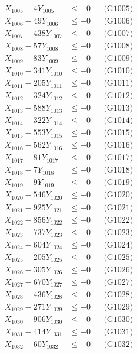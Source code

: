 \documentclass[a4paper,10pt]{article}
\begin{document}
{\begin{align}
X_{1005} - 4Y_{1005} &\leq +0 && \text{(G1005)} \\
X_{1006} - 49Y_{1006} &\leq +0 && \text{(G1006)} \\
X_{1007} - 438Y_{1007} &\leq +0 && \text{(G1007)} \\
X_{1008} - 57Y_{1008} &\leq +0 && \text{(G1008)} \\
X_{1009} - 83Y_{1009} &\leq +0 && \text{(G1009)} \\
X_{1010} - 341Y_{1010} &\leq +0 && \text{(G1010)} \\
\allowbreak
X_{1011} - 205Y_{1011} &\leq +0 && \text{(G1011)} \\
X_{1012} - 324Y_{1012} &\leq +0 && \text{(G1012)} \\
X_{1013} - 588Y_{1013} &\leq +0 && \text{(G1013)} \\
X_{1014} - 322Y_{1014} &\leq +0 && \text{(G1014)} \\
X_{1015} - 553Y_{1015} &\leq +0 && \text{(G1015)} \\
X_{1016} - 562Y_{1016} &\leq +0 && \text{(G1016)} \\
X_{1017} - 81Y_{1017} &\leq +0 && \text{(G1017)} \\
X_{1018} - 7Y_{1018} &\leq +0 && \text{(G1018)} \\
X_{1019} - 9Y_{1019} &\leq +0 && \text{(G1019)} \\
X_{1020} - 546Y_{1020} &\leq +0 && \text{(G1020)} \\
\allowbreak
X_{1021} - 925Y_{1021} &\leq +0 && \text{(G1021)} \\
X_{1022} - 856Y_{1022} &\leq +0 && \text{(G1022)} \\
X_{1023} - 737Y_{1023} &\leq +0 && \text{(G1023)} \\
X_{1024} - 604Y_{1024} &\leq +0 && \text{(G1024)} \\
X_{1025} - 205Y_{1025} &\leq +0 && \text{(G1025)} \\
X_{1026} - 305Y_{1026} &\leq +0 && \text{(G1026)} \\
X_{1027} - 670Y_{1027} &\leq +0 && \text{(G1027)} \\
X_{1028} - 436Y_{1028} &\leq +0 && \text{(G1028)} \\
X_{1029} - 271Y_{1029} &\leq +0 && \text{(G1029)} \\
X_{1030} - 906Y_{1030} &\leq +0 && \text{(G1030)} \\
\allowbreak
X_{1031} - 414Y_{1031} &\leq +0 && \text{(G1031)} \\
X_{1032} - 60Y_{1032} &\leq +0 && \text{(G1032)} \\

\end{align}}
\end{document}
